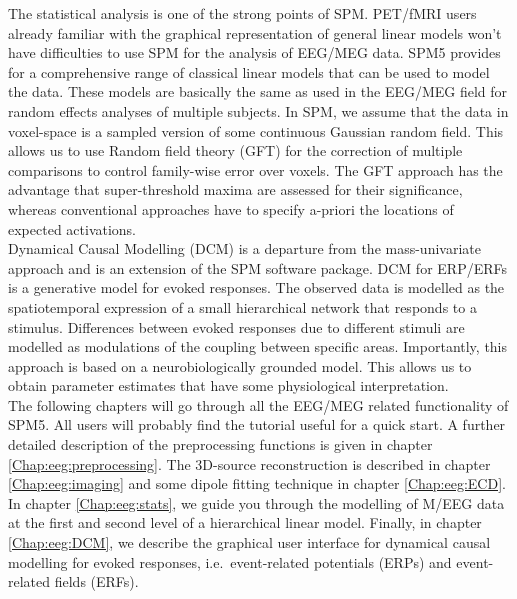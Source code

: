 The statistical analysis is one of the strong points of SPM. PET/fMRI
users already familiar with the graphical representation of
general linear models won't have difficulties to use SPM for the
analysis of EEG/MEG data. SPM5 provides for a comprehensive range of
classical linear models that can be used to model the data. These
models are basically the same as used in the EEG/MEG field
for random effects analyses of multiple subjects. In SPM, we assume
that the data in voxel-space is a sampled version of some continuous Gaussian
random field. This allows us to use Random field theory (GFT)
for the correction of multiple comparisons to control family-wise
error over voxels. The GFT approach has the advantage that
super-threshold maxima are assessed for their significance, whereas
conventional approaches have to specify a-priori the locations of
expected activations.
\\

Dynamical Causal Modelling (DCM) is a departure from the mass-univariate
approach and is an extension of the SPM software package. DCM for ERP/ERFs is a
generative model for evoked responses. The observed data is modelled
as the spatiotemporal expression of a small hierarchical network that
responds to a stimulus. Differences between evoked responses due to different
stimuli are modelled as modulations of the coupling between specific
areas. Importantly, this approach is based on a neurobiologically
grounded model. This allows us to obtain parameter estimates that have
some physiological interpretation.
\\

The following chapters will go through all the EEG/MEG related
functionality of SPM5. All users will probably find the tutorial
useful for a quick start. A further detailed description of the
preprocessing functions is given in chapter
\ref{Chap:eeg:preprocessing}. The 3D-source reconstruction is described
in chapter \ref{Chap:eeg:imaging} and some dipole fitting technique in
chapter \ref{Chap:eeg:ECD}. In chapter \ref{Chap:eeg:stats}, we
guide you through the modelling of M/EEG data at the first and second
level of a hierarchical linear model. Finally, in chapter
\ref{Chap:eeg:DCM}, we describe the graphical user interface for
dynamical causal modelling for evoked 
responses, i.e.~event-related potentials (ERPs) and event-related
fields (ERFs).

